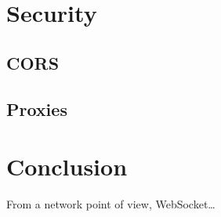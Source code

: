 \documentclass[journal,compsoc]{IEEEtran}
\newcommand{\ws}{WebSocket}
\begin{document}
\section{Security}

\subsection{CORS}

\subsection{Proxies}



\section{Conclusion}

From a network point of view, \ws …


\ifCLASSOPTIONcaptionsoff
  \newpage
\fi




\end{document}
